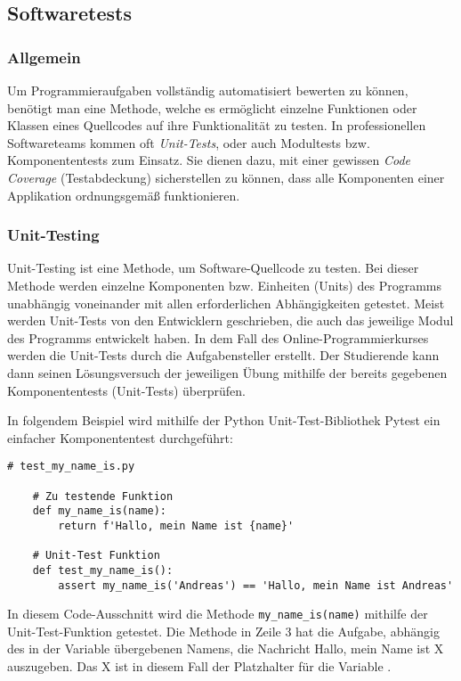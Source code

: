 \subsection{Softwaretests}
\subsubsection{Allgemein}
Um Programmieraufgaben vollständig automatisiert bewerten zu können, benötigt
man eine Methode, welche es ermöglicht einzelne Funktionen oder Klassen eines
Quellcodes auf ihre Funktionalität zu testen. In professionellen Softwareteams
kommen oft \emph{Unit-Tests}, oder auch Modultests bzw. Komponententests zum
Einsatz. Sie dienen dazu, mit einer gewissen \emph{Code Coverage}
(Testabdeckung) sicherstellen zu können, dass alle Komponenten einer Applikation
ordnungsgemäß funktionieren.

\subsubsection{Unit-Testing}\label{unit-tests}
Unit-Testing ist eine Methode, um Software-Quellcode zu testen. Bei dieser
Methode werden einzelne Komponenten bzw. Einheiten (Units) des Programms
unabhängig voneinander mit allen erforderlichen Abhängigkeiten getestet. Meist
werden Unit-Tests von den Entwicklern geschrieben, die auch das jeweilige
Modul des Programms entwickelt haben. In dem Fall des Online-Programmierkurses
werden die Unit-Tests durch die Aufgabensteller erstellt. Der Studierende kann
dann seinen Lösungsversuch der jeweiligen Übung mithilfe der bereits gegebenen
Komponententests (Unit-Tests) überprüfen. \parencite{unit-test}

In folgendem Beispiel wird mithilfe der Python Unit-Test-Bibliothek Pytest
ein einfacher Komponententest durchgeführt:

\begin{lstlisting}[style=Python]
    # test_my_name_is.py

    # Zu testende Funktion
    def my_name_is(name):
        return f'Hallo, mein Name ist {name}'

    # Unit-Test Funktion
    def test_my_name_is():
        assert my_name_is('Andreas') == 'Hallo, mein Name ist Andreas'
\end{lstlisting}

In diesem Code-Ausschnitt wird die Methode \texttt{my\_name\_is(name)} mithilfe
der Unit-Test-Funktion  getestet. Die Methode 
 in Zeile 3 hat die Aufgabe, abhängig des in der
Variable  übergebenen Namens, die Nachricht \glqq Hallo, mein Name
ist X\grqq{} auszugeben. Das X ist in diesem Fall der Platzhalter für die
Variable .

